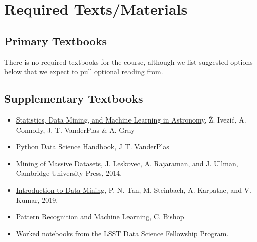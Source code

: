 \documentclass[12pt]{article}
\begin{document}
\section*{\centering Required Texts/Materials}


\subsection*{Primary Textbooks}

There is no required textbooks for the course, although we list suggested options below that we expect to pull optional reading from.

\subsection*{Supplementary Textbooks}

\begin{itemize}
\item \href{https://press.princeton.edu/books/hardcover/9780691198309/statistics-data-mining-and-machine-learning-in-astronomy}{Statistics, Data Mining, and Machine Learning in Astronomy}, Ž. Ivezić, A. Connolly, J. T. VanderPlas \& A. Gray
\item \href{https://jakevdp.github.io/PythonDataScienceHandbook/}{Python Data Science Handbook,} J T. VanderPlas
\item \href{http://www.mmds.org/}{Mining of Massive Datasets}, J. Leskovec, A. Rajaraman, and J. Ullman, Cambridge University Press,
2014.
\item \href{https://www-users.cs.umn.edu/~kumar001/dmbook/index.php}{Introduction to Data Mining}, P.-N. Tan, M. Steinbach, A. Karpatne, and V. Kumar, 2019.
\item \href{https://www.microsoft.com/en-us/
research/people/cmbishop/prml-book/}{Pattern Recognition and Machine Learning}, C. Bishop 
\item \href{https://github.com/LSSTC-DSFP/LSSTC-DSFP-Sessions}{Worked notebooks from the LSST Data Science Fellowship Program}.

\end{itemize}

\end{document}
